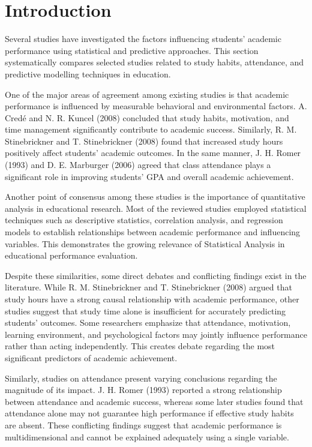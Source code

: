 \documentclass[12pt]{report}
\begin{document}
	\section{Introduction}
	Several studies have investigated the factors influencing students’ academic performance using statistical and predictive approaches. This section systematically compares selected studies related to study habits, attendance, and predictive modelling techniques in education.
	
	One of the major areas of agreement among existing studies is that academic performance is influenced by measurable behavioral and environmental factors. A. Credé and N. R. Kuncel (2008) concluded that study habits, motivation, and time management significantly contribute to academic success. Similarly, R. M. Stinebrickner and T. Stinebrickner (2008) found that increased study hours positively affect students’ academic outcomes. In the same manner, J. H. Romer (1993) and D. E. Marburger (2006) agreed that class attendance plays a significant role in improving students’ GPA and overall academic achievement.
	
	Another point of consensus among these studies is the importance of quantitative analysis in educational research. Most of the reviewed studies employed statistical techniques such as descriptive statistics, correlation analysis, and regression models to establish relationships between academic performance and influencing variables. This demonstrates the growing relevance of Statistical Analysis in educational performance evaluation.
	
	Despite these similarities, some direct debates and conflicting findings exist in the literature. While R. M. Stinebrickner and T. Stinebrickner (2008) argued that study hours have a strong causal relationship with academic performance, other studies suggest that study time alone is insufficient for accurately predicting students’ outcomes. Some researchers emphasize that attendance, motivation, learning environment, and psychological factors may jointly influence performance rather than acting independently. This creates debate regarding the most significant predictors of academic achievement.
	
	Similarly, studies on attendance present varying conclusions regarding the magnitude of its impact. J. H. Romer (1993) reported a strong relationship between attendance and academic success, whereas some later studies found that attendance alone may not guarantee high performance if effective study habits are absent. These conflicting findings suggest that academic performance is multidimensional and cannot be explained adequately using a single variable.
	
\end{document}
